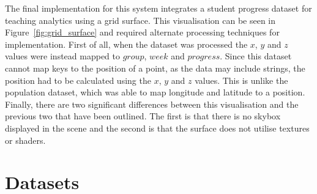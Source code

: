 {	

	The final implementation for this system integrates a student progress dataset for teaching analytics using a grid surface. This visualisation can be seen in Figure~\ref{fig:grid_surface} and required alternate processing techniques for implementation. First of all, when the dataset was processed the $x$, $y$ and $z$ values were instead mapped to $group$, $week$ and $progress$. Since this dataset cannot map keys to the position of a point, as the data may include strings, the position had to be calculated using the $x$, $y$ and $z$ values. This is unlike the population dataset, which was able to map longitude and latitude to a position. Finally, there are two significant differences between this visualisation and the previous two that have been outlined. The first is that there is no skybox displayed in the scene and the second is that the surface does not utilise textures or shaders.

	

	
}

\section{Datasets} {
\label{sec:datasets}
	
	


}

